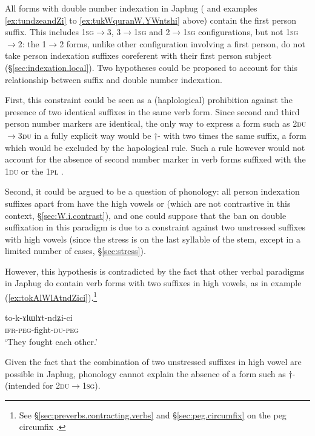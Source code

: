 All forms with double number indexation in Japhug ( and examples \ref{ex:tundzeandZi} to \ref{ex:tukWquranW.YWntshi} above) contain the first person  suffix. This includes \textsc{1sg}$\rightarrow$3, 3$\rightarrow$\textsc{1sg} and 2$\rightarrow$\textsc{1sg} configurations, but not \textsc{1sg}$\rightarrow$2: the 1$\rightarrow$2 forms, unlike other configuration involving a first person, do not take person indexation suffixes coreferent with their first person subject (§\ref{sec:indexation.local}). Two hypotheses could be proposed to account for this relationship between  suffix and double number indexation.

First, this constraint could be seen as a (haplological) prohibition against the presence of two identical suffixes in the same verb form. Since second and third person number markers are identical, the only way to express a form such as \textsc{2du$\rightarrow$3du} in a fully explicit way would be $\dagger$\siga{}- with two times the same suffix, a form which would be excluded by the hapological rule. Such a rule however would not account for the absence of second number marker in verb forms suffixed with the \textsc{1du}  or the \textsc{1pl} .

Second, it could be argued to be a question of phonology: all person indexation suffixes apart from  have the high vowels  or  (which are not contrastive in this context, §\ref{sec:W.i.contrast}), and one could suppose that the ban on double suffixation in this paradigm is due to a constraint against two unstressed suffixes with high vowels (since the stress is on the last syllable of the stem, except in a limited number of cases, §\ref{sec:stress}).

However, this hypothesis is contradicted by the fact that other verbal paradigms in Japhug do contain verb forms with two suffixes in high vowels, as in example (\ref{ex:tokAlWlAtndZici}).\footnote{See §\ref{sec:preverbs.contracting.verbs} and §\ref{sec:peg.circumfix} on the peg  circumfix . }

\begin{exe}
\ex \label{ex:tokAlWlAtndZici}
\gll to-k-ɤlɯlɤt-ndʑi-ci \\
\textsc{ifr}-\textsc{peg}-fight-\textsc{du}-\textsc{peg} \\
\glt `They fought each other.'
\end{exe}

Given the fact that the combination of two unstressed suffixes in high vowel are possible in Japhug, phonology cannot explain the absence of a form such as $\dagger$\siga{}- (intended for \textsc{2du$\rightarrow$1sg}).

